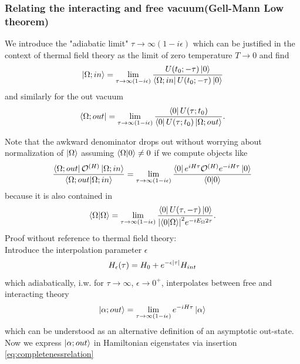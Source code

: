 \subsubsection{Relating the interacting and free vacuum(Gell-Mann Low theorem) }
\begin{mybox}{}
	We introduce the "adiabatic limit" $\tau \rightarrow \infty (1-i\epsilon)$ which can be justified in the context of thermal field theory as the limit of zero temperature $T\rightarrow 0$ and find
	\begin{equation}
		\label{eq:relationfreeInteractingvacuum}
		\ket{\Omega;in} = \lim_{\tau\rightarrow \infty(1-i \epsilon)} \frac{U(t_0;-\tau) \ket{0}}{\bra{\Omega;in} U(t_0;-\tau) \ket{0}}
	\end{equation}
	and similarly for the out vacuum
	\begin{equation}
		\bra{\Omega;out} = \lim_{\tau\rightarrow \infty(1-i \epsilon)} \frac{\bra{0} U(\tau;t_0)}{\bra{0} U(\tau;t_0) \ket{\Omega;out}}.
	\end{equation}
\end{mybox}
Note that the awkward denominator drops out without worrying about normalization of $\ket{\Omega}$ assuming $\bra{\Omega}\ket{0}\neq 0$ if we compute objects like
\begin{equation}
	\frac{\bra{\Omega;out} \mathcal{O}^{(H)} \ket{\Omega;in}}{\braket{\Omega;out}{\Omega;in}} = \lim_{\tau\rightarrow \infty(1-i \epsilon)} \frac{\bra{0}e^{iH\tau} \mathcal{O}^{(H)} e^{-iH\tau} \ket{0}}{\braket{0}{0}}
		\end{equation}
		because it is also contained in 
		\begin{equation}
			\braket{\Omega}{\Omega} = \lim_{\tau\rightarrow \infty(1-i \epsilon)} \frac{\bra{0}U(\tau,-\tau) \ket{0}}{\abs{\bra{0}\ket{\Omega}}^2 e^{-i E_\Omega 2 \tau}}.
		\end{equation}
		Proof without reference to thermal field theory:\\
		Introduce the interpolation parameter $\epsilon$
		\begin{equation}
			H_\epsilon(\tau) = H_0 + e^{-\epsilon \abs{\tau}} H_{int} 
		\end{equation}
		which adiabatically, i.w. for $\tau\rightarrow \infty$, $\epsilon\rightarrow 0^+$, interpolates between free and interacting theory
		\begin{equation}
			\ket{\alpha;out} = \lim_{\tau\rightarrow \infty(1-i \epsilon)} e^{-i H\tau } \ket{\alpha}
		\end{equation}
		which can be understood as an alternative definition of an asymptotic out-state. Now we express $\ket{\alpha;out}$ in Hamiltonian eigenstates via insertion \ref{eq:completenessrelation}  
